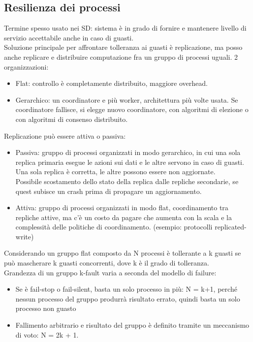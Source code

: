 \documentclass{article}
\begin{document}
\subsection{Resilienza dei processi}
Termine spesso usato nei SD: sistema è in grado di fornire e mantenere livello di servizio accettabile anche in caso di guasti.\\ Soluzione principale per affrontare tolleranza ai guasti è replicazione, ma posso anche replicare e distribuire computazione fra un gruppo di processi uguali. 2 organizzazioni:
\begin{itemize}
\item Flat: controllo è completamente distribuito, maggiore overhead.
\item Gerarchico: un coordinatore e più worker, architettura più volte usata. Se coordinatore fallisce, si elegge nuovo coordinatore, con algoritmi di elezione o con algoritmi di consenso distribuito.
\end{itemize}
Replicazione può essere attiva o passiva:
\begin{itemize}
\item Passiva: gruppo di processi organizzati in modo gerarchico, in cui una sola replica primaria esegue le azioni sui dati e le altre servono in caso di guasti.\\ Una sola replica è corretta, le altre possono essere non aggiornate.\\ Possibile scostamento dello stato della replica dalle repliche secondarie, se quest subisce un crash prima di propagare un aggiornamento.
\item Attiva: gruppo di processi organizzati in modo flat, coordinamento tra repliche attive, ma c'è un costo da pagare che aumenta con la scala e la complessità delle politiche di coordinamento. (esempio: protocolli replicated-write)
\end{itemize}
Considerando un gruppo flat composto da N processi è tollerante a k guasti se può mascherare k guasti concorrenti, dove k è il grado di tolleranza.\\ Grandezza di un gruppo k-fault varia a seconda del modello di failure:
\begin{itemize}
\item Se è fail-stop o fail-silent, basta un solo processo in più: N = k+1, perché nessun processo del gruppo produrrà risultato errato, quindi basta un solo processo non guasto
\item Fallimento arbitrario e risultato del gruppo è definito tramite un meccanismo di voto: N = 2k + 1.
\end{itemize}
\end{document}
